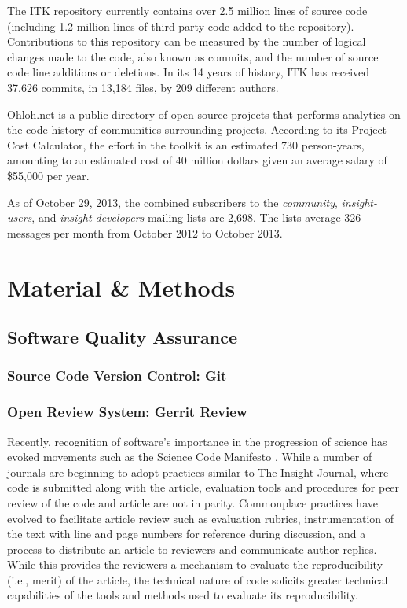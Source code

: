 \documentclass{frontiersENG} %
\begin{document}
%
%
The ITK repository currently contains over 2.5 million lines of source code
(including 1.2 million lines of third-party code added to the repository).
Contributions to this repository can be measured by the number of logical
changes made to the code, also known as commits, and the number of source code
line additions or deletions. In its 14 years of history, ITK has received
37,626 commits, in 13,184 files, by 209 different authors.

Ohloh.net is a public directory of open source projects that performs analytics
on the code history of communities surrounding projects. According to its
Project Cost Calculator\cite{OhlohITK2013}, the effort in the toolkit is an
estimated 730 person-years, amounting to an estimated cost of 40 million
dollars given an average salary of \$55,000 per year.

As of October 29, 2013, the combined subscribers to the \textit{community},
\textit{insight-users}, and \textit{insight-developers} mailing lists are 2,698.
The lists average 326 messages per month from October 2012 to October 2013.


\section{Material \& Methods}

\subsection{Software Quality Assurance}

\subsubsection{Source Code Version Control: Git}

\subsubsection{Open Review System: Gerrit Review}
Recently, recognition of software’s importance in the progression of science has evoked movements such as the Science Code Manifesto \cite{Barnes2010}. While a number of journals are beginning to adopt practices similar to The Insight Journal, where code is submitted along with the article, evaluation tools and procedures for peer review of the code and article are not in parity.  Commonplace practices have evolved to facilitate article review such as evaluation rubrics, instrumentation of the text with line and page numbers for reference during discussion, and a process to distribute an article to reviewers and communicate author replies.  While this provides the reviewers a mechanism to evaluate the reproducibility (i.e., merit) of the article, the technical nature of code solicits greater technical capabilities of the tools and methods used to evaluate its reproducibility.
\end{document}
